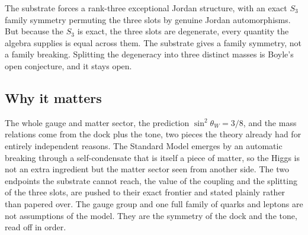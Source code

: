 \begin{result}
The substrate forces a rank-three exceptional Jordan structure, with an exact $S_3$ family symmetry permuting the three slots by genuine Jordan automorphisms. But because the $S_3$ is exact, the three slots are degenerate, every quantity the algebra supplies is equal across them. The substrate gives a family symmetry, not a family breaking. Splitting the degeneracy into three distinct masses is Boyle's open conjecture, and it stays open.
\end{result}

\subsection{Why it matters}

The whole gauge and matter sector, the prediction $\sin^2 \theta_W = 3/8$, and the mass relations come from the dock plus the tone, two pieces the theory already had for entirely independent reasons. The Standard Model emerges by an automatic breaking through a self-condensate that is itself a piece of matter, so the Higgs is not an extra ingredient but the matter sector seen from another side. The two endpoints the substrate cannot reach, the value of the coupling and the splitting of the three slots, are pushed to their exact frontier and stated plainly rather than papered over. The gauge group and one full family of quarks and leptons are not assumptions of the model. They are the symmetry of the dock and the tone, read off in order.
